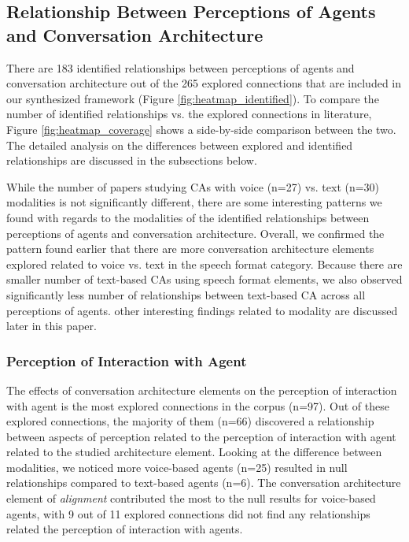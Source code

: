\subsection{Relationship Between Perceptions of Agents and Conversation Architecture}

There are 183 identified relationships between perceptions of agents and conversation architecture out of the 265 explored connections that are included in our synthesized framework (Figure \ref{fig:heatmap_identified}). To compare the number of identified relationships vs. the explored connections in literature, Figure \ref{fig:heatmap_coverage} shows a side-by-side comparison between the two. The detailed analysis on the differences between explored and identified relationships are discussed in the subsections below.

While the number of papers studying CAs with voice (n=27) vs. text (n=30) modalities is not significantly different, there are some interesting patterns we found with regards to the modalities of the identified relationships between perceptions of agents and conversation architecture. Overall, we confirmed the pattern found earlier that there are more conversation architecture elements explored related to voice vs. text in the speech format category. Because there are smaller number of text-based CAs using speech format elements, we also observed significantly less number of relationships between text-based CA across all perceptions of agents. other interesting findings related to modality are discussed later in this paper.



\subsubsection{Perception of Interaction with Agent}

The effects of conversation architecture elements on the perception of interaction with agent is the most explored connections in the corpus (n=97). Out of these explored connections, the majority of them (n=66) discovered a relationship between aspects of perception related to the perception of interaction with agent related to the studied architecture element. Looking at the difference between modalities, we noticed more voice-based agents (n=25) resulted in null relationships compared to text-based agents (n=6). The conversation architecture element of \textit{alignment} contributed the most to the null results for voice-based agents, with 9 out of 11 explored connections did not find any relationships related the perception of interaction with agents.

